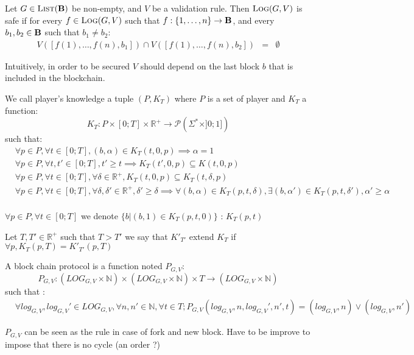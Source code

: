 \begin{mydef}
Let $G \in \text{\sc List}(\text{\bf B})$ be non-empty, and $V$ be a validation rule. Then $\text{\sc Log}(G,V)$ is safe if for every $f \in \text{\sc Log}(G,V)$ such that $f : \{1, \ldots, n\} \to \text{\bf B}$, and every $b_1, b_2 \in \text{\bf B}$ such that $b_1 \neq b_2$:
\begin{eqnarray*}
V([f(1), \ldots, f(n), b_1]) \cap V([f(1), \ldots, f(n), b_2]) & = & \emptyset
\end{eqnarray*}
\end{mydef}
Intuitively, in order to be secured $V$ should depend on the last block $b$ that is included in the blockchain.

\begin{mydef}
	We call player's knowledge a tuple $(P,K_{T})$ where $P$ is a set of player and $K_{T}$ a function:
	$$K_{T} : P\times [0;T] \times \mathbb{R}^+ \rightarrow \mathscr{P}(\Sigma^* \times ]0;1])$$
	such that: 
	\begin{align*}
	&\forall p \in P,\forall t\in [ 0;T ], (b,\alpha) \in K_{T}(t,0,p) \implies \alpha = 1 \\
	&\forall p \in P,\forall t,t'\in [ 0;T ], t' \geq t \implies K_{T}(t',0,p) \subseteq K(t,0,p)  \\
	&\forall p \in P,\forall t\in [ 0;T ], \forall \delta \in \mathbb{R}^+, K_{T}(t,0,p) \subseteq K_{T}(t,\delta,p) \\
	&\forall p \in P,\forall t\in [ 0;T ], \forall \delta,\delta' \in \mathbb{R}^+, \delta' \geq \delta \implies \forall (b,\alpha) \in K_{T}(p,t,\delta), \exists (b,\alpha') \in K_{T}(p,t,\delta'), \alpha'\geq \alpha\\
	\end{align*}
\end{mydef}

\begin{mynota}
	$\forall p \in P, \forall t\in [0;T]$ we denote $\{b | (b,1) \in K_{T}(p,t,0)\}$ : $K_{T}(p,t)$
\end{mynota}

\begin{mydef}
	Let $T,T' \in \mathbb{R}^+$ such that $T>T'$ we say that $K'_{T'}$ extend $K_{T}$ if $\forall p, K_{T}(p,T) = K'_{T'}(p,T)$
\end{mydef}

\begin{mydef}
	A block chain protocol is a function noted $P_{G,V}$:
	$$P_{G,V} : (LOG_{G,V}\times \mathbb{N})  \times (LOG_{G,V}\times \mathbb{N}) \times T \rightarrow (LOG_{G,V}\times \mathbb{N}) $$
	such that :
		\begin{align*}
		&\forall log_{G,V},log_{G,V}' \in LOG_{G,V}, \forall n,n' \in \mathbb{N} , \forall t \in T; P_{G,V}(log_{G,V},n,log_{G,V}',n',t) = (log_{G,V},n) \lor (log_{G,V},n')		\end{align*}
\end{mydef}
\begin{myrem}
	$P_{G,V}$ can be seen as the rule in case of fork and new block. 
	Have to be improve to impose that there is no cycle (an order ?)
\end{myrem}

